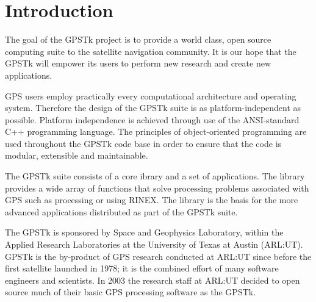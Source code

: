 \chapter{Introduction}

The goal of the GPSTk project is to provide a world class, open source computing suite to the satellite navigation community. It is our hope that the GPSTk will empower its users to perform new research and create new applications.

GPS users employ practically every computational architecture and operating system. Therefore the design of the GPSTk suite is as platform-independent as possible. Platform independence is achieved through use of the ANSI-standard C++ programming language. The principles of object-oriented programming are used throughout the GPSTk code base in order to ensure that the code is modular, extensible and maintainable.

The GPSTk suite consists of a core ibrary and a set of applications. The library provides a wide array of functions that solve processing problems associated with GPS such as processing or using RINEX. The library is the basis for the more advanced applications distributed as part of the GPSTk suite.

The GPSTk is sponsored by Space and Geophysics Laboratory, within the Applied Research Laboratories at the University of Texas at Austin (ARL:UT). GPSTk is the by-product of GPS research conducted at ARL:UT since before the first satellite launched in 1978; it is the combined effort of many software engineers and scientists. In 2003 the research staff at ARL:UT decided to open source much of their basic GPS processing software as the GPSTk.
